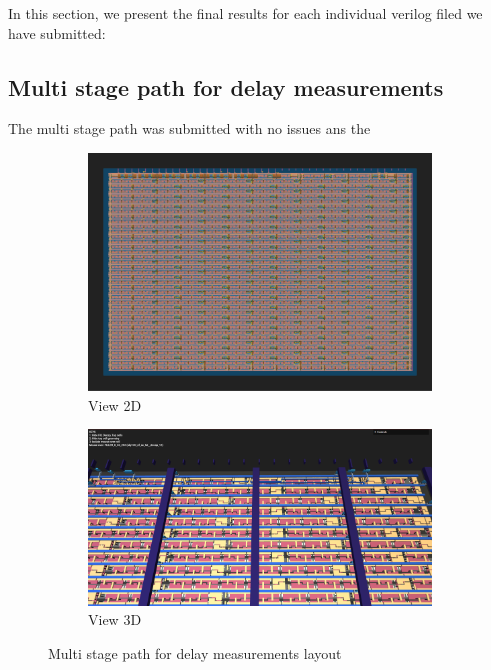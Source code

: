 In this section, we present the final results for each individual verilog filed we have submitted:

\subsection{Multi stage path for delay measurements}
The multi stage path was submitted with no issues ans the
\begin{figure}[H]
    \centering
    \begin{subfigure}[b]{0.45\textwidth}
        \includegraphics[width=\linewidth]{Pictures/Result_Delay_2D_View.png}
        \caption{View 2D}\label{fig:delay_2D}
    \end{subfigure}
    \begin{subfigure}[b]{0.45\textwidth}
        \includegraphics[width=\linewidth]{Pictures/Result_Delay_3D_View.png}
        \caption{View 3D}\label{fig:delay_3D}
    \end{subfigure}
    \caption{Multi stage path for delay measurements layout}\label{fig:delay_Layout}
\end{figure}



